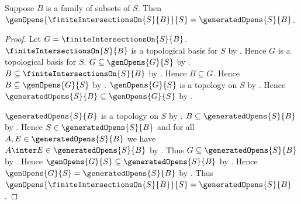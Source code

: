\begin{theorem}\label{finite_intersection_genopens_eq_generated_opens}
    Suppose $B$ is a family of subsets of $S$.
    Then
        $\genOpens{\finiteIntersectionsOn{S}{B}}{S}
            =\generatedOpens{S}{B}$.
\end{theorem}
\begin{proof}
    Let $G=\finiteIntersectionsOn{S}{B}$.
    $\finiteIntersectionsOn{S}{B}$ is a topological basis for $S$ by
        .
    Hence $G$ is a topological basis for $S$.
    $G\subseteq\genOpens{G}{S}$ by .
    $B\subseteq\finiteIntersectionsOn{S}{B}$ by
        .
    Hence $B\subseteq G$.
    Hence $B\subseteq\genOpens{G}{S}$ by .
    $\genOpens{G}{S}$ is a topology on $S$ by
        .
    Hence $\generatedOpens{S}{B}\subseteq\genOpens{G}{S}$ by
        .

    $\generatedOpens{S}{B}$ is a topology on $S$ by
        .
    $B\subseteq\generatedOpens{S}{B}$ by
        .
    Hence $S\in\generatedOpens{S}{B}$ and
        for all $A,E\in\generatedOpens{S}{B}$ we have
            $A\inter E\in\generatedOpens{S}{B}$ by
        .
    Thus $G\subseteq\generatedOpens{S}{B}$ by
        .
    Hence $\genOpens{G}{S}\subseteq\generatedOpens{S}{B}$ by
        .
    Hence $\genOpens{G}{S}=\generatedOpens{S}{B}$ by
        .
    Thus $\genOpens{\finiteIntersectionsOn{S}{B}}{S}
        =\generatedOpens{S}{B}$.
\end{proof}

